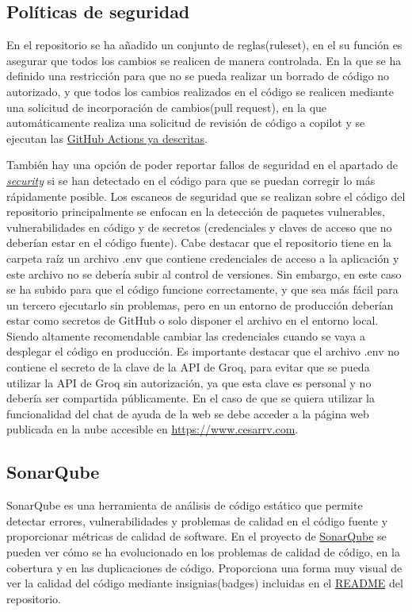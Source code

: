 \subsection{Políticas de seguridad}
\label{subsec:politicas}

En el repositorio se ha añadido un conjunto de reglas(ruleset), en el su función es asegurar que todos los cambios se realicen de manera controlada. En la que se ha definido una restricción para que no se pueda realizar un borrado de código no autorizado, y que todos los cambios realizados en el código se realicen mediante una solicitud de incorporación de cambios(pull request), en la que automáticamente realiza una solicitud de revisión de código a copilot y se ejecutan las \hyperref[subsec:acciones]{GitHub Actions ya descritas}.

También hay una opción de poder reportar fallos de seguridad en el apartado de \href{https://github.com/CesarRodrigu/GII-24.19-contramedidas-IoT-mediante-reinforcement-learning/security}{\textit{security}} si se han detectado en el código para que se puedan corregir lo más rápidamente posible.
Los escaneos de seguridad que se realizan sobre el código del repositorio principalmente se enfocan en la detección de paquetes vulnerables, vulnerabilidades en código y de secretos (credenciales y claves de acceso que no deberían estar en el código fuente).
Cabe destacar que el repositorio tiene en la carpeta raíz un archivo .env que contiene credenciales de acceso a la aplicación y este archivo no se debería subir al control de versiones. Sin embargo, en este caso se ha subido para que el código funcione correctamente, y que sea más fácil para un tercero ejecutarlo sin problemas, pero en un entorno de producción deberían estar como secretos de GitHub o solo disponer el archivo en el entorno local. Siendo altamente recomendable cambiar las credenciales cuando se vaya a desplegar el código en producción.
Es importante destacar que el archivo .env no contiene el secreto de la clave de la API de Groq, para evitar que se pueda utilizar la API de Groq sin autorización, ya que esta clave es personal y no debería ser compartida públicamente. En el caso de que se quiera utilizar la funcionalidad del chat de ayuda de la web se debe acceder a la página web publicada en la nube accesible en \url{https://www.cesarrv.com}.

\subsection{SonarQube}
\label{subsec:sonarqube}
SonarQube es una herramienta de análisis de código estático que permite detectar errores, vulnerabilidades y problemas de calidad en el código fuente y proporcionar métricas de calidad de software. En el proyecto de \href{https://sonarcloud.io/project/overview?id=CesarRodrigu_GII-24.19-contramedidas-IoT-mediante-reinforcement-learning}{SonarQube} se pueden ver cómo se ha evolucionado en los problemas de calidad de código, en la cobertura y en las duplicaciones de código. Proporciona una forma muy visual de ver la calidad del código mediante insignias(badges) incluidas en el \href{https://github.com/CesarRodrigu/GII-24.19-contramedidas-IoT-mediante-reinforcement-learning/blob/main/README.md}{README} del repositorio.

